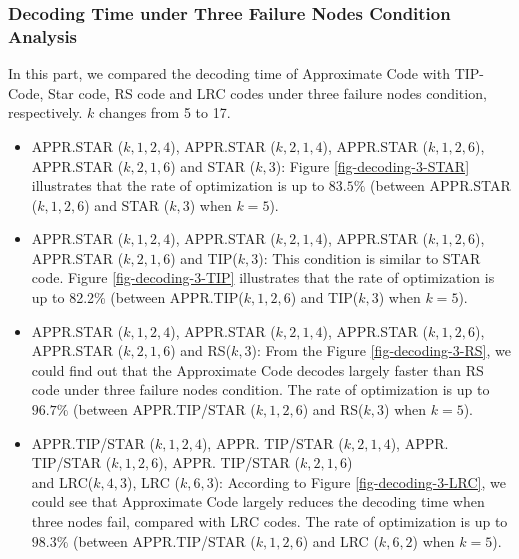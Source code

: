 \documentclass[sigconf]{acmart}
\begin{document}
\subsubsection{Decoding Time under Three Failure Nodes Condition Analysis}
In this part, we compared the decoding time of Approximate Code with TIP-Code, Star code, RS code and LRC codes under three failure nodes condition, respectively. $k$ changes from 5 to 17.
\begin{itemize}
    \item APPR.STAR ($k,1,2,4$), APPR.STAR ($k,2,1,4$), APPR.STAR ($k,1,2,6$), APPR.STAR ($k,2,1,6$) and STAR ($k,3$): Figure \ref{fig-decoding-3-STAR} illustrates that the rate of optimization is up to $83.5\%$ (between APPR.STAR ($k,1,2,6$) and STAR ($k,3$) when $k = 5$).
    \item APPR.STAR ($k,1,2,4$), APPR.STAR ($k,2,1,4$), APPR.STAR ($k,1,2,6$), APPR.STAR ($k,2,1,6$) and TIP($k,3$): This condition is similar to STAR code. Figure \ref{fig-decoding-3-TIP} illustrates that the rate of optimization is up to 82.2\% (between APPR.TIP($k,1,2,6$) and TIP($k,3$) when $k = 5$).
    \item APPR.STAR ($k,1,2,4$), APPR.STAR ($k,2,1,4$), APPR.STAR ($k,1,2,6$), APPR.STAR ($k,2,1,6$) and RS($k,3$): From the Figure \ref{fig-decoding-3-RS}, we could find out that the Approximate Code decodes largely faster than RS code under three failure nodes condition. The rate of optimization is up to $96.7\%$ (between APPR.TIP/STAR ($k,1,2,6$) and RS($k,3$) when $k = 5$).
    \item APPR.TIP/STAR ($k,1,2,4$), APPR. TIP/STAR ($k,2,1,4$), APPR. TIP/STAR ($k,1,2,6$), APPR. TIP/STAR ($k,2,1,6$)  \\
    and LRC($k,4,3$), LRC ($k,6,3$):
    According to Figure \ref{fig-decoding-3-LRC}, we could see that Approximate Code largely reduces the decoding time when three nodes fail, compared with LRC codes. The rate of optimization is up to $98.3\%$  (between APPR.TIP/STAR ($k,1,2,6$) and LRC ($k, 6, 2$) when $k = 5$).
\end{itemize}
\end{document}
